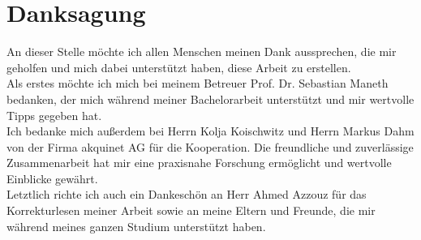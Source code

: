 \section*{Danksagung}
An dieser Stelle möchte ich allen Menschen meinen Dank aussprechen, die mir geholfen und mich dabei unterstützt haben, diese Arbeit zu erstellen. \\
Als erstes möchte ich mich bei meinem Betreuer Prof. Dr. Sebastian Maneth bedanken, der mich während meiner Bachelorarbeit unterstützt und mir wertvolle Tipps gegeben hat.\\
Ich bedanke mich außerdem bei Herrn Kolja Koischwitz und Herrn Markus Dahm von der Firma akquinet AG für die Kooperation. Die freundliche und zuverlässige Zusammenarbeit hat mir eine praxisnahe Forschung ermöglicht und wertvolle Einblicke gewährt.\\
Letztlich richte ich auch ein Dankeschön an Herr Ahmed Azzouz für das Korrekturlesen meiner Arbeit sowie an meine Eltern und Freunde, die mir während meines ganzen Studium unterstützt haben.